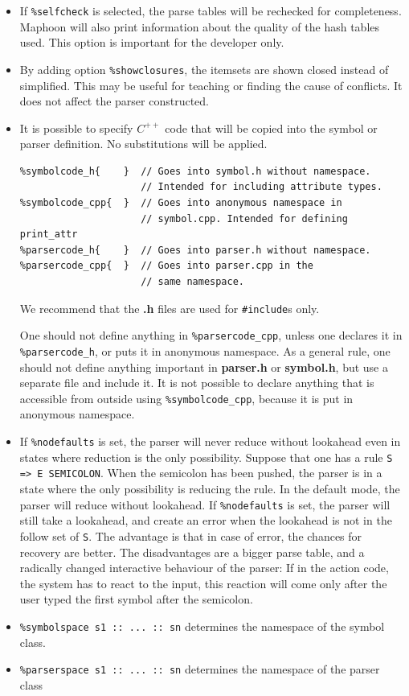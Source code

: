 \documentclass{article}
\begin{document}
\begin{itemize}
\item
   If \verb+%selfcheck+ is selected, the parse tables
   will be rechecked for completeness. 
   Maphoon will also print information about the quality
   of the hash tables used. 
   This option is important for the developer only. 

\item
   By adding option \verb+%showclosures+, the itemsets are shown closed
   instead of simplified. 
   This may be useful for teaching or 
   finding the cause of conflicts. 
   It does not affect the parser constructed. 
\item
   It is possible to specify $ C^{++} $ code that will 
   be copied into the symbol or parser definition.
   No substitutions will be applied. 
\begin{verbatim}
%symbolcode_h{    }  // Goes into symbol.h without namespace.
                     // Intended for including attribute types.
%symbolcode_cpp{  }  // Goes into anonymous namespace in 
                     // symbol.cpp. Intended for defining print_attr
%parsercode_h{    }  // Goes into parser.h without namespace.
%parsercode_cpp{  }  // Goes into parser.cpp in the
                     // same namespace. \end{verbatim}
   We recommend that the {\bf .h} files are used for 
   \verb+#include+s only. 
   
   One should not define anything in \verb+%parsercode_cpp+,
   unless one declares it in \verb+%parsercode_h+, or
   puts it in anonymous namespace.
   As a general rule, one should not define 
   anything important in {\bf parser.h} or {\bf symbol.h}, but use
   a separate file and include it.   
   It is not possible to declare anything that is 
   accessible from outside using \verb+%symbolcode_cpp+,
   because it is put in anonymous namespace.

\item
   If \verb+%nodefaults+ is set, the parser will never reduce
   without lookahead even in states where reduction is the only
   possibility. 
   Suppose that one has a rule \verb+S => E SEMICOLON+.
   When the semicolon has been pushed, the parser is in a state 
   where the only possibility is reducing
   the rule. In the default mode, the parser will reduce
   without lookahead. If \verb+%nodefaults+ is set, the parser 
   will still take a lookahead, and create
   an error when the lookahead is not in the follow set
   of \verb+S+. 
   The advantage is that in case of error, the chances for recovery
   are better.
   The disadvantages are a bigger parse table, and 
   a radically changed interactive behaviour
   of the parser: If in the action code, the system
   has to react to the input, this reaction will come only after
   the user typed the first symbol after the semicolon. 
\item
   \verb+%symbolspace s1 :: ... :: sn+ determines the namespace
   of the symbol class.
\item
   \verb+%parserspace s1 :: ... :: sn+ determines the namespace
   of the parser class
\end{itemize}
\end{document}
